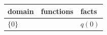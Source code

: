 \documentclass[border=5pt]{standalone}
\begin{document}
\begin{tabular}{lll}
domain & functions & facts \\
\hline
$\{0\}$ &  & $q(0)$ \\
\end{tabular}
\end{document}
